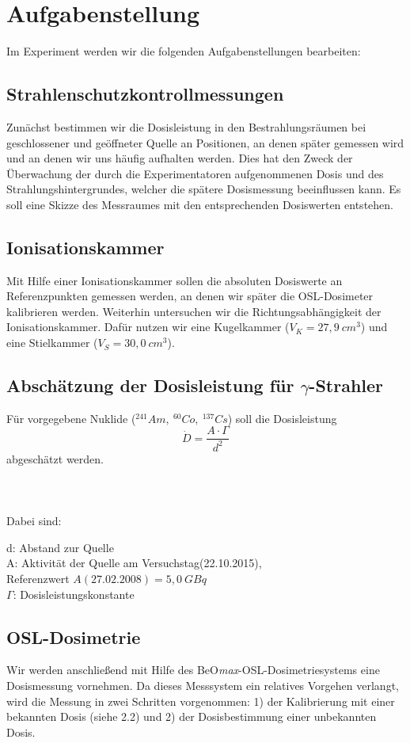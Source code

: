 \chapter{Aufgabenstellung}
Im Experiment werden wir die folgenden Aufgabenstellungen bearbeiten:
\section{Strahlenschutzkontrollmessungen}
Zunächst bestimmen wir die Dosisleistung in den Bestrahlungsräumen bei geschlossener und geöffneter Quelle an Positionen, an denen später gemessen wird und an denen wir uns häufig aufhalten werden. Dies hat den Zweck der Überwachung der durch die Experimentatoren aufgenommenen Dosis und des Strahlungshintergrundes, welcher die spätere Dosismessung beeinflussen kann. Es soll eine Skizze des Messraumes mit den entsprechenden Dosiswerten entstehen.

\section{Ionisationskammer}
Mit Hilfe einer Ionisationskammer sollen die absoluten Dosiswerte an Referenzpunkten gemessen werden, an denen wir später die OSL-Dosimeter kalibrieren werden. Weiterhin untersuchen wir die Richtungsabhängigkeit der Ionisationskammer. Dafür nutzen wir eine Kugelkammer ($V_K = 27,9\ cm^3$) und eine Stielkammer ($V_S = 30,0\ cm^3$).

\section{Abschätzung der Dosisleistung für $\gamma$-Strahler}
Für vorgegebene Nuklide ($^{241}Am,\ ^{60}Co,\ ^{137}Cs$) soll die Dosisleistung
\begin{equation}
	\dot{D}=\frac{A \cdot \Gamma}{d^2}
\end{equation}
abgeschätzt werden. \\ \\ \\ \\
Dabei sind:
\begin{center}
\begin{minipage}{.9\textwidth}
d: Abstand zur Quelle\\
	A: Aktivität der Quelle am Versuchstag(22.10.2015), \\
	Referenzwert $A(27.02.2008) = 5,0\ GBq$\\
	$\Gamma$: Dosisleistungskonstante
	
\end{minipage}
\end{center}

\section{OSL-Dosimetrie}
Wir werden anschließend mit Hilfe des BeO\textit{max}-OSL-Dosimetriesystems eine Dosismessung vornehmen. Da dieses Messsystem ein relatives Vorgehen verlangt, wird die Messung in zwei Schritten vorgenommen: 1) der Kalibrierung mit einer bekannten Dosis (siehe 2.2) und 2) der Dosisbestimmung einer unbekannten Dosis.